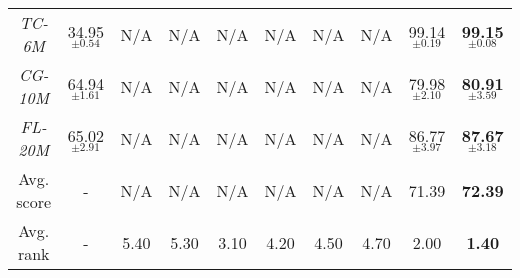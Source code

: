 \begin{table*}[]
{\begin{tabular}{@{}c||c||ccccccc|c@{}}
      \emph{TC-6M    }  & 34.95$_{\pm 0.54}$    & N/A                & N/A                 & N/A                         & N/A                 & N/A                 & N/A                 & 99.14$_{\pm 0.19}$  & \textbf{99.15$_{\pm 0.08}$} \\
      \emph{CG-10M    } & 64.94$_{\pm 1.61}$    & N/A                & N/A                 & N/A                         & N/A                 & N/A                 & N/A                 & 79.98$_{\pm 2.10}$  & \textbf{80.91$_{\pm 3.59}$} \\
      \emph{FL-20M}     & 65.02$_{\pm 2.91}$    & N/A                & N/A                 & N/A                         & N/A                 & N/A                 & N/A                 & 86.77 $_{\pm 3.97}$ & \textbf{87.67$_{\pm 3.18}$} \\
      \midrule
      \midrule
      Avg. score        & \multicolumn{1}{c}{-} & N/A                & N/A                 & N/A                         & N/A                 & N/A                 & N/A                 & 71.39               & \textbf{72.39}              \\
      \midrule
      \midrule
      Avg. rank         & \multicolumn{1}{c}{-} & 5.40               & 5.30                & 3.10                        & 4.20                & 4.50                & 4.70                & 2.00                & \textbf{1.40}               \\
      \bottomrule
    \end{tabular}}
\end{table*}



